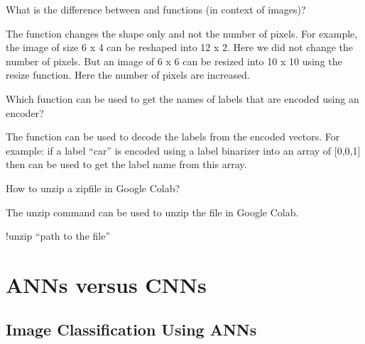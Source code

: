 	\begin{qanda}
		\begin{question}
What is the difference between  and  functions (in context of images)?
		\end{question}
		\begin{answer}
The  function changes the shape only and not the number of pixels.  For example, the image of size 6 x 4 can be reshaped into 12 x 2.  Here we did not change the number of pixels.  But an image of 6 x 6 can be resized into 10 x 10 using the resize function.  Here the number of pixels are increased.
		\end{answer}
	\end{qanda}

	\begin{qanda}
		\begin{question}
Which function can be used to get the names of labels that are encoded using an encoder?
		\end{question}
		\begin{answer}
The  function can be used to decode the labels from the encoded vectors.  For example: if a label ``car'' is encoded using a label binarizer into an array of [0,0,1] then  can be used to get the label name from this array.
		\end{answer}
	\end{qanda}

	\begin{qanda}
		\begin{question}
How to unzip a zipfile in Google Colab?
		\end{question}
		\begin{answer}
The unzip command can be used to unzip the file in Google Colab.
		\begin{code}[\codenumbering]{}
			\codeitemnonumber !unzip ``path to the file''
		\end{code}
		\end{answer}
	\end{qanda}

	\section{ANNs versus CNNs}
	\subsection{Image Classification Using ANNs}
